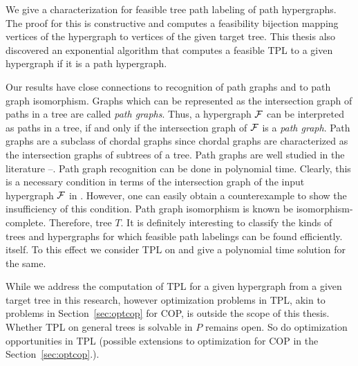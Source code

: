 We give a characterization for feasible tree path labeling of path
hypergraphs. The proof for this is constructive and computes a
feasibility bijection mapping vertices of the hypergraph to vertices
of the given target tree. This thesis also discovered an exponential
algorithm that computes a feasible TPL to a given hypergraph if it is
a path hypergraph.

Our results have close connections to recognition of path graphs and
to path graph isomorphism.  Graphs which can be represented as the
intersection graph of paths in a tree are called {\em path
  graphs}\cite{mcg04}. Thus, a hypergraph ${\cal F}$ can be interpreted as
paths in a tree, if and only if the intersection graph of ${\cal F}$ is a
{\em path graph}. Path graphs are a subclass of chordal graphs since
chordal graphs are characterized as the intersection graphs of
subtrees of a tree\cite{mcg04}.  Path graphs are well studied in the
literature \cite{plr70}--\cite{mcg04}.  Path graph recognition can be done in
polynomial time\cite{gav78,aas93}.  Clearly, this is a necessary
condition in terms of the intersection graph of the input hypergraph
${\cal F}$ in \FTPL. However, one can easily obtain a counterexample to
show the insufficiency of this condition.  Path graph isomorphism is known be
isomorphism-complete\cite{kklv10}. Therefore,  tree $T$.  It is
definitely interesting to classify the kinds of trees and hypergraphs
for which feasible path labelings can be  found
efficiently.   itself.  To this effect
we consider TPL on {\kstar} and give a polynomial time solution for
the same.


While we address the computation of TPL for a given
hypergraph%
from a given target tree in this research, however optimization
problems in TPL, akin to problems in Section~\ref{sec:optcop} for COP,
is outside the scope of this thesis. Whether TPL on general trees is
solvable in $P$ remains open. So do optimization opportunities in TPL
(possible extensions to optimization for COP in the
Section~\ref{sec:optcop}.).


